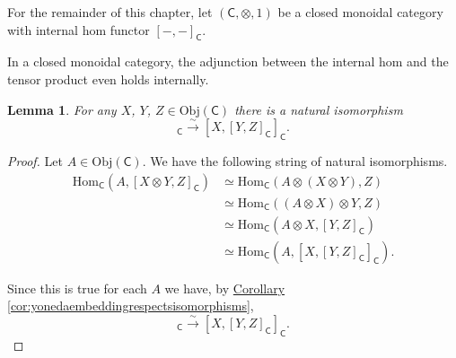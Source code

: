 \documentclass[a4paper,10pt]{scrreprt}
\newcommand{\Obj}{\mathrm{Obj}}
\newcommand{\Hom}{\mathrm{Hom}}
\theoremstyle{definition}
\theoremstyle{plain}
\newtheorem{lemma}{Lemma}[section]
\theoremstyle{remark}
\begin{document}
For the remainder of this chapter, let $(\mathsf{C}, \otimes, 1)$ be a closed monoidal category with internal hom functor $[-,-]_{\mathsf{C}}$.

In a closed monoidal category, the adjunction between the internal hom and the tensor product even holds internally.
\begin{lemma}
  For any $X$, $Y$, $Z \in \Obj(\mathsf{C})$ there is a natural isomorphism
  \begin{equation*}
    [X \otimes Y, Z]_{\mathsf{C}} \stackrel{\sim}{\to} [X, [Y, Z]_{\mathsf{C}}]_{\mathsf{C}}.
  \end{equation*}
\end{lemma}
\begin{proof}
  Let $A \in \Obj(\mathsf{C})$. We have the following string of natural isomorphisms.
  \begin{align*}
    \Hom_{\mathsf{C}}(A, [X \otimes Y, Z]_{\mathsf{C}}) &\simeq \Hom_{\mathsf{C}}(A \otimes (X \otimes Y), Z) \\
    &\simeq \Hom_{\mathsf{C}}((A \otimes X) \otimes Y, Z) \\
    &\simeq \Hom_{\mathsf{C}}(A \otimes X, [Y, Z]_{\mathsf{C}}) \\
    &\simeq \Hom_{\mathsf{C}}(A, [X, [Y, Z]_{\mathsf{C}}]_{\mathsf{C}}).
  \end{align*}

  Since this is true for each $A$ we have, by \hyperref[cor:yonedaembeddingrespectsisomorphisms]{Corollary \ref*{cor:yonedaembeddingrespectsisomorphisms}},
  \begin{equation*}
    [X \otimes Y, Z]_{\mathsf{C}} \stackrel{\sim}{\to} [X, [Y, Z]_{\mathsf{C}}]_{\mathsf{C}}.
  \end{equation*}
\end{proof}
\end{document}
